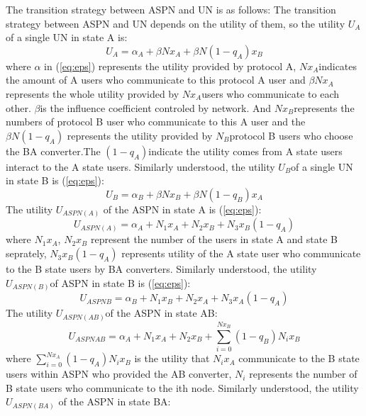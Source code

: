 \documentclass{article}
\begin{document}
The transition strategy between ASPN and UN is as follows:
The transition strategy between ASPN and UN depends on the utility of them, so the utility \(U_{A}\) of a single UN
in state A is:
\begin{displaymath} \label{eq:eps}
U_{A}=\alpha_{A}+\beta Nx_{A}+\beta N(1-q_{A})x_{B}
\end{displaymath}
where \(\alpha\) in (\ref{eq:eps}) represents the utility provided by protocol A, \(Nx_{A}\)indicates the amount of 
A users who communicate to this protocol A user and \(\beta Nx_{A}\) represents the whole utility provided 
by \(Nx_{A}\)users who communicate to each other. \(\beta\)is the influence coefficient controled by network. 
And \(Nx_{B}\)represents the numbers of protocol B user who communicate to this A user and the \(\beta N(1-q_{A})\)
represents the utility provided by \(N_{B}\)protocol B users who choose the BA converter.The \((1-q_{A})\)indicate the 
utility comes from A state users interact to the A state users. Similarly understood, the utility \(U_{B}\)of a single UN in 
state B is (\ref{eq:eps}):
\begin{displaymath}\label{eq:eps}
U_{B}=\alpha_{B}+\beta Nx_{B}+\beta N(1-q_{B})x_{A}
\end{displaymath}
The utility \(U_{ASPN(A)}\) of the ASPN in state A is (\ref{eq:eps}):
\begin{displaymath}\label{eq:eps}
U_{ASPN(A)}=\alpha_{A}+N_{1}x_{A}+N_{2}x_{B}+N_{3}x_{B}(1-q_{A})
\end{displaymath}
where \(N_{1}x_{A}\), \(N_{2}x_{B}\) represent the number of the users in state A and state B seprately, 
\(N_{3}x_{B}(1-q_{A})\) represents utility of the A state user who communicate to the B state users by 
BA converters. Similarly understood, the utility \(U_{ASPN(B)}\)of ASPN in state B is (\ref{eq:eps}):
\begin{displaymath} \label{eq:eps}
U_{ASPN{B}}=\alpha_{B}+N_{1}x_{B}+N_{2}x_{A}+N_{3}x_{A}(1-q_{A})
\end{displaymath}
The utility \(U_{ASPN(AB)}\)of the ASPN in state AB:
\begin{displaymath}
U_{ASPN{AB}}=\alpha_{A}+N_{1}x_{A}+N_{2}x_{B}+\sum_{i=0}^{Nx_{B}}(1-q_{B})N_{i}x_{B}
\end{displaymath}
where \(\sum_{i=0}^{Nx_{A}}(1-q_{A})N_{i}x_{B}\) is the utility that \(N_{i}x_{A}\) communicate to the B state users
within ASPN who provided the AB converter, \(N_{i}\) represents the number of B state users who communicate to the ith node. 
Similarly understood, the utility \(U_{ASPN(BA)}\) of the ASPN in state BA:
\end{document}
